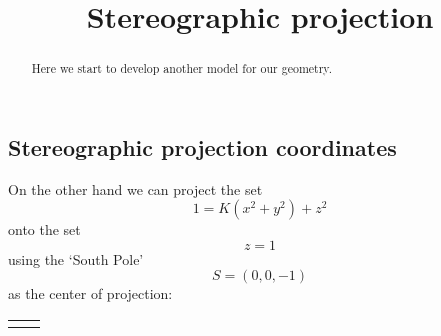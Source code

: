 \documentclass{ximera}
\title{Stereographic projection}
\begin{document}
\begin{abstract}
Here we start to develop another model for our geometry.
\end{abstract}
\maketitle


\subsection*{Stereographic projection coordinates}

On the other hand we can project the set
\[
1=K\left(  x^{2}+y^{2}\right)  +z^{2}%
\]
onto the set%
\[
z=1
\]
using the `South Pole'%
\[
S=\left(  0,0,-1\right)
\]
as the center of projection:%

\begin{tabular}
[c]{cc}%
{\includegraphics[
natheight=3.406500in,
natwidth=4.912100in,
height=1.9389in,
width=2.789in
]%
{MXAJBZ0M.jpg}%
}%
&
{\includegraphics[
natheight=4.263500in,
natwidth=4.889600in,
height=1.9415in,
width=2.226in
]%
{MXAJBZ0N.jpg}%
}%
\end{tabular}
\end{document}
